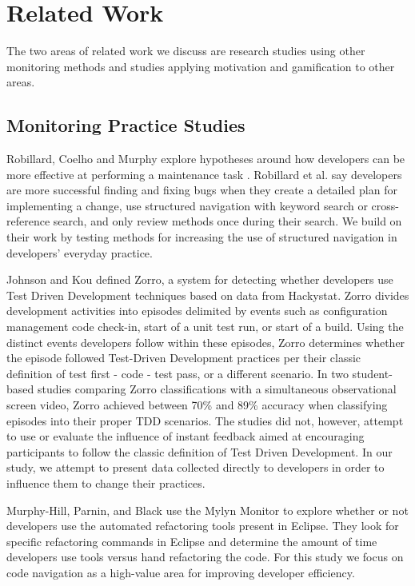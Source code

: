 \documentclass{sig-alternate}
\begin{document}
\section{Related Work}

The two areas of related work we discuss are research studies using other monitoring methods and studies applying motivation and gamification to other areas.

\subsection{Monitoring Practice Studies }

Robillard, Coelho and Murphy explore hypotheses around how developers can be more effective at performing a maintenance task \cite{wbsnipes:Robillard2004How}.  Robillard et al. say developers are more successful finding and fixing bugs when they create a detailed plan for implementing a change, use structured navigation with keyword search or cross-reference search, and only review methods once during their search.  We build on their work by testing methods for increasing the use of structured navigation in developers' everyday practice.

Johnson and Kou defined Zorro\cite{V:Johnson2007Automated}, a system for detecting whether developers use Test Driven Development techniques based on data from Hackystat.  Zorro divides development activities into episodes delimited by events such as configuration management code check-in, start of a unit test run, or start of a build.  Using the distinct events developers follow within these episodes, Zorro determines whether the episode followed Test-Driven Development practices per their classic definition of test first - code - test pass, or a different scenario.  In two student-based studies comparing Zorro classifications with a simultaneous observational screen video, Zorro achieved between 70\% \cite{Kou2010Operational} and 89\% \cite{V:Johnson2007Automated} accuracy when classifying episodes into their proper TDD scenarios.  The studies did not, however, attempt to use or evaluate the influence of instant feedback aimed at encouraging participants to follow the classic definition of Test Driven Development.  In our study, we attempt to present data collected directly to developers in order to influence them to change their practices.

Murphy-Hill, Parnin, and Black \cite{V:MurphyHill2012How} use the Mylyn Monitor to explore whether or not developers use the automated refactoring tools present in Eclipse.  They look for specific refactoring commands in Eclipse and determine the amount of time developers use tools versus hand refactoring the code.  For this study we focus on code navigation as a high-value area for improving developer efficiency.
\end{document}
